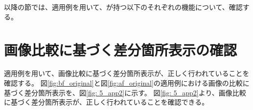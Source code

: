 以降の節では、適用例を用いて、\toolName が持つ以下のそれぞれの機能について、確認する。

\section{画像比較に基づく差分箇所表示の確認}
適用例を用いて、画像比較に基づく差分箇所表示が、正しく行われていることを確認する。
図\ref{fig:bf_original}と図\ref{fig:af_original}の適用例における画像の比較に基づく差分箇所表示を、図\ref{fig: 5_app2}に示す。
図\ref{fig: 5_app2}より、画像比較に基づく差分箇所表示が、正しく行われていることを確認できる。

